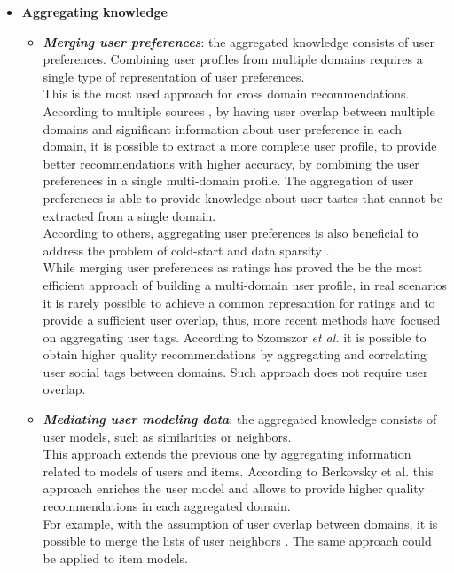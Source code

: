 \begin{itemize}
\item \textbf{Aggregating knowledge}
\begin{itemize}
\item \textbf{\textit{Merging user preferences}}: the aggregated knowledge consists of user preferences. Combining user profiles from multiple domains requires a single type of representation of user preferences.\\
This is the most used approach for cross domain recommendations. According to multiple sources \cite{10.1007/s11257-012-9131-2, 10.1007/978-3-540-88564-1_40, 10.1007/978-3-540-73078-1_44, 10.1145/1297231.1297238, 10.1007/s00354-008-0041-0}, by having user overlap between multiple domains and significant information about user preference in each domain, it is possible to extract a more complete user profile, to provide better recommendations with higher accuracy, by combining the user preferences in a single multi-domain profile. The aggregation of user preferences is able to provide knowledge about user tastes that cannot be extracted from a single domain.\\
According to others, aggregating user preferences is also beneficial to address the problem of cold-start \cite{10.1007/978-3-642-38844-6_25} and data sparsity \cite{10.1007/s11257-012-9128-x}.\\
While merging user preferences as ratings has proved the be the most efficient approach of building a multi-domain user profile, in real scenarios it is rarely possible to achieve a common represantion for ratings and to provide a sufficient user overlap, thus, more recent methods have focused on aggregating user tags. According to Szomszor \textit{et al.} \cite{10.1145/1379092.1379103, 10.1007/978-3-540-88564-1_40} it is possible to obtain higher quality recommendations by aggregating and correlating user social tags between domains. Such approach does not require user overlap.
\item \textbf{\textit{Mediating user modeling data}}: the aggregated knowledge consists of user models, such as similarities or neighbors.\\
This approach extends the previous one by aggregating information related to models of users and items. According to Berkovsky et al. \cite{10.1007/s11257-007-9042-9, 10.1007/11590323_22} this approach enriches the user model and allows to provide higher quality recommendations in each aggregated domain.\\
For example, with the assumption of user overlap between domains, it is possible to merge the lists of user neighbors \cite{10.1145/1297231.1297238}. The same approach could be applied to item models.

\end{itemize}
\end{itemize}
